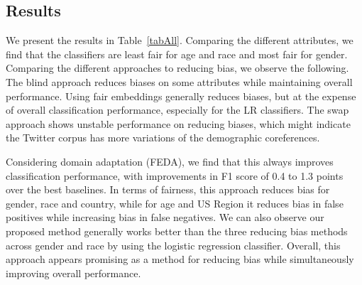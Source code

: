 \subsection{Results}

We present the results in Table~\ref{tabAll}.
Comparing the different attributes, we find that the classifiers are least fair for age and race and most fair for gender.
Comparing the different approaches to reducing bias, we observe the following.
The blind approach reduces biases on some attributes while maintaining overall performance.
Using fair embeddings generally reduces biases, but at the expense of overall classification performance, especially for the LR classifiers.
The swap approach shows unstable performance on reducing biases, which might indicate the Twitter corpus has more variations of the demographic coreferences.


Considering domain adaptation (FEDA),
we find that this always improves classification performance,
with improvements in F1 score of 0.4 to 1.3 points over the best baselines.
In terms of fairness, this approach reduces bias for gender, race and country, while for age and US Region it reduces bias in false positives while increasing bias in false negatives.
We can also observe our proposed method generally works better than the three reducing bias methods across gender and race by using the logistic regression classifier.
Overall, this approach appears promising as a method for reducing bias while simultaneously improving overall performance.












